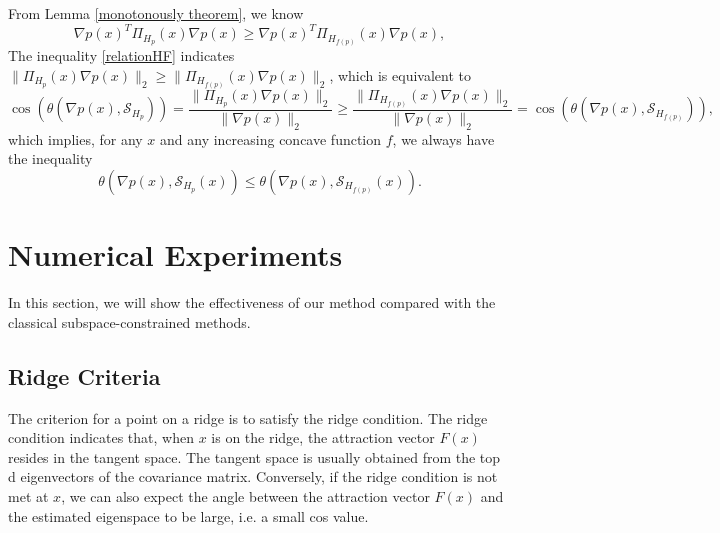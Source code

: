 \documentclass[aos,preprint]{imsart}
\theoremstyle{remark}
\begin{document}
 From Lemma \ref{monotonously theorem}, we know
 \begin{equation}\label{relationHF}
 \nabla p(x)^T \Pi_{H_p}(x) \nabla p(x)\geq \nabla p(x)^T \Pi_{H_{f(p)}}(x) \nabla p(x),
 \end{equation}
 The inequality \eqref{relationHF} indicates $\| \Pi_{H_p}(x) \nabla p(x)\|_2 \geq  \|\Pi_{H_{f(p)}}(x) \nabla p(x)\|_2$, which is equivalent to 
 \begin{equation*}\label{angle_ineq}
\cos( \theta(\nabla p(x), {\mathcal S}_{H_p})) = \frac{\| \Pi_{H_p}(x) \nabla p(x)\|_2}{\|\nabla p(x)\|_2} 
\geq  \frac{\|\Pi_{H_{f(p)}}(x) \nabla p(x)\|_2}{\|\nabla p(x)\|_2} = \cos(\theta(\nabla p(x), {\mathcal S}_{H_{f(p)}})),
\end{equation*}
which implies, for any $x$ and any increasing concave function $f$, we always have the inequality 
 \[
 \theta(\nabla p(x), {\mathcal S}_{H_{p}}(x)) \leq \theta(\nabla p(x), {\mathcal S}_{H_{f(p)}}(x)).\] 


\section{Numerical Experiments}\label{experiments}
In this section, we will show the effectiveness of our method compared with the classical subspace-constrained methods.
\subsection{Ridge Criteria}
The criterion for a point on a ridge is to satisfy the ridge condition. The ridge condition indicates that, when $x$ is on the ridge, the attraction vector $F(x)$ resides in the tangent space. The tangent space is usually obtained from the top d eigenvectors of the covariance matrix. Conversely, if the ridge condition is not met at $x$, we can also expect the angle between the attraction vector $F(x)$ and the estimated eigenspace to be large, i.e. a small cos value. 
\end{document}
